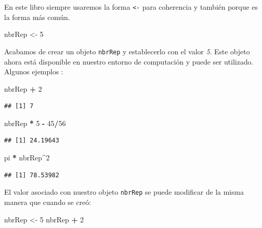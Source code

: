 \documentclass[]{book}
\newenvironment{Shaded}{\begin{snugshade}}{\end{snugshade}}
\newcommand{\DecValTok}[1]{\textcolor[rgb]{0.00,0.00,0.81}{#1}}
\newcommand{\StringTok}[1]{\textcolor[rgb]{0.31,0.60,0.02}{#1}}
\newcommand{\OperatorTok}[1]{\textcolor[rgb]{0.81,0.36,0.00}{\textbf{#1}}}
\newcommand{\NormalTok}[1]{#1}
\begin{document}
En este libro siempre usaremos la forma \texttt{\textless{}-} para
coherencia y también porque es la forma más común.

\begin{Shaded}
\begin{Highlighting}[]
\NormalTok{nbrRep <-}\StringTok{ }\DecValTok{5}
\end{Highlighting}
\end{Shaded}

Acabamos de crear un objeto \texttt{nbrRep} y establecerlo con el valor
\emph{5}. Este objeto ahora está disponible en nuestro entorno de
computación y puede ser utilizado. Algunos ejemplos :

\begin{Shaded}
\begin{Highlighting}[]
\NormalTok{nbrRep }\OperatorTok{+}\StringTok{ }\DecValTok{2}
\end{Highlighting}
\end{Shaded}

\begin{verbatim}
## [1] 7
\end{verbatim}

\begin{Shaded}
\begin{Highlighting}[]
\NormalTok{nbrRep }\OperatorTok{*}\StringTok{ }\DecValTok{5} \OperatorTok{-}\StringTok{ }\DecValTok{45}\OperatorTok{/}\DecValTok{56}
\end{Highlighting}
\end{Shaded}

\begin{verbatim}
## [1] 24.19643
\end{verbatim}

\begin{Shaded}
\begin{Highlighting}[]
\NormalTok{pi }\OperatorTok{*}\StringTok{ }\NormalTok{nbrRep}\OperatorTok{^}\DecValTok{2}
\end{Highlighting}
\end{Shaded}

\begin{verbatim}
## [1] 78.53982
\end{verbatim}

El valor asociado con nuestro objeto \texttt{nbrRep} se puede modificar
de la misma manera que cuando se creó:

\begin{Shaded}
\begin{Highlighting}[]
\NormalTok{nbrRep <-}\StringTok{ }\DecValTok{5}
\NormalTok{nbrRep }\OperatorTok{+}\StringTok{ }\DecValTok{2}
\end{Highlighting}
\end{Shaded}
\end{document}

